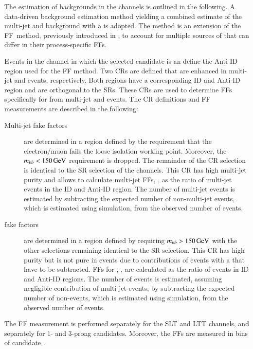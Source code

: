 The estimation of \jettotauhadvis backgrounds in the \lephad channels is
outlined in the following. A data-driven background estimation method yielding a
combined estimate of the multi-jet and \ttbar background with a \faketauhadvis
is adopted. The method is an extension of the FF~method, previously introduced
in , to account for multiple sources of \faketauhadvis
that can differ in their process-specific FFs.

Events in the \lephad channel in which the selected \tauhadvis candidate is an
\antitau define the Anti-ID region used for the FF method. Two CRs are defined
that are enhanced in multi-jet and \ttbar events, respectively. Both regions
have a corresponding ID and Anti-ID region and are orthogonal to the SRs. These
CRs are used to determine FFs specifically for \faketauhadvis from multi-jet and
\ttbar events. The CR definitions and FF measurements are described in the
following:
\begin{description}

\item[Multi-jet fake factors] are determined in a region defined by the
  requirement that the electron/muon fails the loose isolation working
  point. Moreover, the $m_{bb} < \SI{150}{\ensuremath{\text{GeV}}}$ requirement is dropped. The
  remainder of the CR selection is identical to the SR selection of the \lephad
  channels. This CR has high multi-jet purity and allows to calculate multi-jet
  FFs, \FFqcd, as the ratio of multi-jet events in the ID and Anti-ID
  region. The number of multi-jet events is estimated by subtracting the
  expected number of non-multi-jet events, which is estimated using simulation,
  from the observed number of events.

\item[\ttbar fake factors] are determined in a region defined by requiring
  $m_{bb} > \SI{150}{\ensuremath{\text{GeV}}}$ with the other selections remaining identical to the
  SR selection. This CR has high \ttbar purity but is not pure in \ttbarFakes
  events due to contributions of \ttbar events with a \truetauhadvis that have
  to be subtracted. FFs for \ttbar, \FFttbar, are calculated as the ratio of
  \ttbarFakes events in ID and Anti-ID regions. The number of \ttbarFakes events
  is estimated, assuming negligible contribution of multi-jet events, by
  subtracting the expected number of non-\ttbarFakes events, which is estimated
  using simulation, from the observed number of events.

\end{description}
The FF measurement is performed separately for the \lephad SLT and LTT channels,
and separately for 1- and 3-prong \tauhadvis candidates. Moreover, the FFs are
measured in bins of \tauhadvis candidate \pT.

